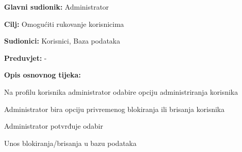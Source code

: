 			\noindent {}
			\begin{packed_item}
				
				\item \textbf{Glavni sudionik: }Administrator
				\item  \textbf{Cilj:} Omogućiti rukovanje korisnicima 
				\item  \textbf{Sudionici:} Korisnici, Baza podataka
				\item  \textbf{Preduvjet:} -
				\item  \textbf{Opis osnovnog tijeka:}
				
				\item[] \begin{packed_enum}
					
					\item Na profilu korisnika administrator odabire opciju administriranja korisnika
					\item Administrator bira opciju privremenog blokiranja ili brisanja korisnika
					\item Administrator potvrđuje odabir
					\item Unos blokiranja/brisanja u bazu podataka
				\end{packed_enum}
				
			\end{packed_item}
		
